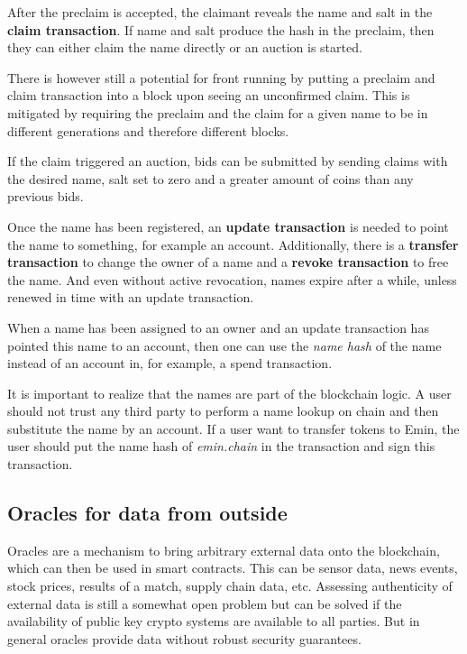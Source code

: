 After the preclaim is accepted, the claimant reveals the name and salt in the
\textbf{claim transaction}. If name and salt produce the hash in the preclaim,
then they can either claim the name directly or an auction is started.

There is however still a potential for front running by putting a preclaim and
claim transaction into a block upon seeing an unconfirmed claim. This is
mitigated by requiring the preclaim and the claim for a given name to be in
different generations and therefore different blocks.

If the claim triggered an auction, bids can be submitted by sending claims with
the desired name, salt set to zero and a greater amount of coins than any
previous bids.

Once the name has been registered, an \textbf{update transaction} is needed to
point the name to something, for example an account. Additionally, there is
a \textbf{transfer transaction} to change the owner of a name and a
\textbf{revoke transaction} to free the name.
And even without active revocation, names expire after a while, unless renewed
in time with an update transaction.

When a name has been assigned to an owner and an update transaction has pointed
this name to an account, then one can use the \textit{name hash} of the name
instead of an account in, for example, a spend transaction.

It is important to realize that the names are part of the blockchain
logic. A user should not trust any third party to perform a name lookup on
chain and then substitute the name by an account. If a user want to
transfer tokens to Emin, the user should put the name hash of
\textit{emin.chain} in the transaction and sign this transaction.

\subsection{Oracles for data from outside}
\label{sect:aeoracle}

Oracles are a mechanism to bring arbitrary external data onto the blockchain,
which can then be used in smart contracts. This can be sensor data, news
events, stock prices, results of a match, supply chain data, etc.
Assessing authenticity of external data
\cite{zhang2016town,guarnizo2019pdfs, adler2018astraea} is still a somewhat
open problem but can be solved if the availability of public key crypto
systems are available to all parties. But in general oracles provide data
without robust security guarantees.

